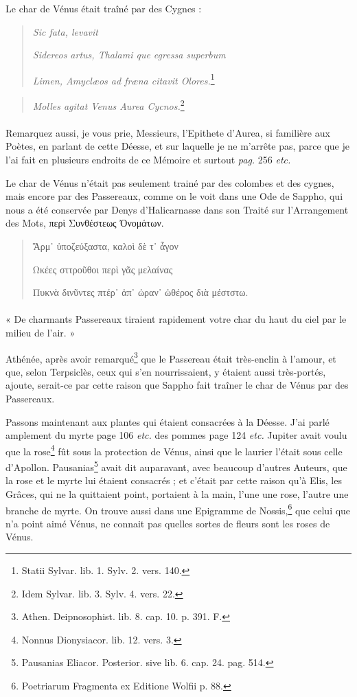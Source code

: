 \documentclass[a4paper, 11pt, oneside, polutonikogreek, french]{article}
\begin{document}
Le char de Vénus était traîné par des Cygnes :
\begin{quotation}
\hspace*{15mm}\emph{Sic fata, levavit}

\emph{Sidereos artus, Thalami que egressa superbum}

\emph{Limen, Amyclæos ad fræna citavit Olores.}\footnote{Statii Sylvar. lib. 1. Sylv. 2. vers. 140.}
\end{quotation}
\begin{quotation}
\emph{Molles agitat Venus Aurea Cycnos.}\footnote{Idem Sylvar. lib. 3. Sylv. 4. vers. 22.}
\end{quotation}
\paragraph{}
Remarquez aussi, je vous prie, Messieurs, l'Epithete d'Aurea, si familière aux Poètes, en parlant de cette Déesse, et sur laquelle je ne m'arrête pas, parce que je l'ai fait en plusieurs endroits de ce Mémoire et surtout \emph{pag.} 256 \emph{etc.}

Le char de Vénus n'était pas seulement trainé par des colombes et des cygnes, mais encore par des Passereaux, comme on le voit dans une Ode de Sappho, qui nous a été conservée par Denys d'Halicarnasse dans son Traité sur l'Arrangement des Mots, περὶ Συνθέστεως Ὀνομάτων.
\begin{quotation}
Ἅρμ᾽ ὑποζεύξαστα, καλοὶ δὲ τ᾽ ἆγον

Ωκέες σττροῦθοι περὶ γᾶς μελαίνας

Πυκνὰ δινῦντες πτέρ᾽ ἀπ᾿ ὠραν᾽ ὠθέρος διὰ μέστστω.
\end{quotation}
\paragraph{}
« De charmants Passereaux tiraient rapidement votre char du haut du ciel par le milieu de l'air. »

Athénée, après avoir remarqué\footnote{Athen. Deipnosophist. lib. 8. cap. 10. p. 391. F.} que le Passereau était très-enclin à l'amour, et que, selon Terpsiclès, ceux qui s'en nourrissaient, y étaient aussi très-portés, ajoute, serait-ce par cette raison que Sappho fait traîner le char de Vénus par des Passereaux.

Passons maintenant aux plantes qui étaient consacrées à la Déesse. J'ai parlé amplement du myrte page 106 \emph{etc.} des pommes page 124 \emph{etc.} Jupiter avait voulu que la rose\footnote{Nonnus Dionysiacor. lib. 12. vers. 3.} fût sous la protection de Vénus, ainsi que le laurier l'était sous celle d'Apollon. Pausanias\footnote{Pausanias Eliacor. Posterior. sive lib. 6. cap. 24. pag. 514.} avait dit auparavant, avec beaucoup d'autres Auteurs, que la rose et le myrte lui étaient consacrés ; et c'était par cette raison qu'à Elis, les Grâces, qui ne la quittaient point, portaient à la main, l'une une rose, l'autre une branche de myrte. On trouve aussi dans une Epigramme de Nossis,\footnote{Poetriarum Fragmenta ex Editione Wolfii p. 88.} que celui que n'a point aimé Vénus, ne connait pas quelles sortes de fleurs sont les roses de Vénus.
\end{document}
